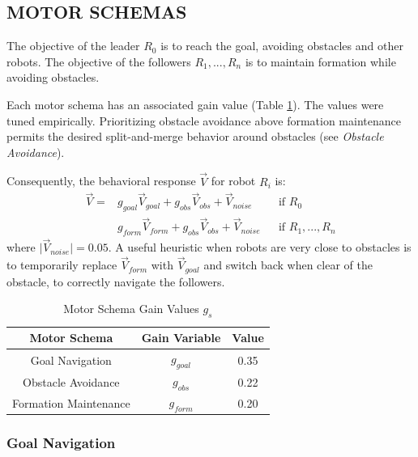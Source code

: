 \documentclass[letterpaper, 10 pt, conference]{ieeeconf}  %
\begin{document}
\subsection{MOTOR SCHEMAS}

The objective of the leader $R_0$ is to reach the goal, avoiding obstacles and other robots. The objective of the followers $R_1,...,R_n$ is to maintain formation while avoiding obstacles.

Each motor schema has an associated gain value (Table \ref{motor_schema_gs}). The values were tuned empirically. Prioritizing obstacle avoidance above formation maintenance permits the desired split-and-merge behavior around obstacles (see \textit{Obstacle Avoidance}).

Consequently, the behavioral response $\vec{V}$ for robot $R_i$ is:
\begin{equation*}
\begin{aligned}
\vec{V} = & g_{goal} \vec{V}_{goal} + g_{obs} \vec{V}_{obs} + \vec{V}_{noise}    && \text{if $R_0$} \\
              & g_{form} \vec{V}_{form} + g_{obs} \vec{V}_{obs} + \vec{V}_{noise}   && \text{if $R_1,...,R_n$}
\end{aligned}
\end{equation*}
where $\lvert\vec{V}_{noise}\rvert = 0.05$. A useful heuristic when robots are very close to obstacles is to temporarily replace $\vec{V}_{form}$ with $\vec{V}_{goal}$ and switch back when clear of the obstacle, to correctly navigate the followers.

\begin{table}[h]
\caption{Motor Schema Gain Values $g_s$}
\label{motor_schema_gs}
\begin{center}
\begin{tabular}{|c|c|c|}
\hline
Motor Schema & Gain Variable & Value \\
\hline
Goal Navigation & $g_{goal}$ & 0.35 \\
Obstacle Avoidance & $g_{obs}$ & 0.22 \\
Formation Maintenance & $g_{form}$ & 0.20 \\
\hline
\end{tabular}
\end{center}
\end{table}

\subsubsection*{Goal Navigation}
\end{document}

